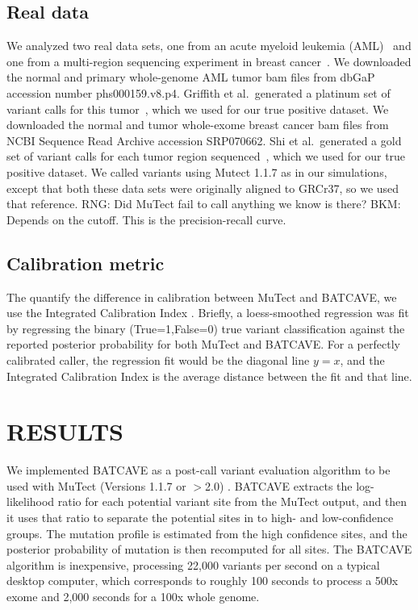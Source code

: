 \documentclass[a4,center,fleqn]{NAR}
\newcommand{\rngcomment}[1]{{\color{red}RNG: #1}}
\newcommand{\bkmcomment}[1]{{\color{blue}BKM: #1}}
\newcommand{\batcave}{BATCAVE\xspace}
\begin{document}
\subsection{Real data}
We analyzed two real data sets, one from an acute myeloid leukemia (AML)~\cite{Griffith2015} and one from a multi-region sequencing experiment in breast cancer~\cite{Shi2018}.
We downloaded the normal and primary whole-genome AML tumor bam files from dbGaP accession number phs000159.v8.p4.
Griffith et al.\ generated a platinum set of variant calls for this tumor~\cite{Griffith2015}, which we used for our true positive dataset.
We downloaded the normal and tumor whole-exome breast cancer bam files from NCBI Sequence Read Archive accession SRP070662.
Shi et al.\ generated a gold set of variant calls for each tumor region sequenced~\cite{Shi2018}, which we used for our true positive dataset.
We called variants using Mutect 1.1.7 as in our simulations, except that both these data sets were originally aligned to GRCr37, so we used that reference.
\rngcomment{Did MuTect fail to call anything we know is there?}
\bkmcomment{Depends on the cutoff. This is the precision-recall curve.}

\subsection{Calibration metric}
The quantify the difference in calibration between MuTect and \batcave, we use the Integrated Calibration Index \cite{Austin2019}.
Briefly, a loess-smoothed regression was fit by regressing the binary (True=1,False=0) true variant classification against the reported posterior probability for both MuTect and \batcave.
For a perfectly calibrated caller, the regression fit would be the diagonal line $y=x$, and the Integrated Calibration Index is the average distance between the fit and that line.


\section{RESULTS}
We implemented \batcave as a post-call variant evaluation algorithm to be used with MuTect (Versions 1.1.7 or $>$2.0) \cite{Cibulskis2013}.
\batcave extracts the log-likelihood ratio for each potential variant site from the MuTect output, and then it uses that ratio to separate the potential sites in to high- and low-confidence groups.
The mutation profile is estimated from the high confidence sites, and the posterior probability of mutation is then recomputed for all sites.
The \batcave algorithm is inexpensive, processing 22,000 variants per second on a typical desktop computer, which corresponds to roughly 100 seconds to process a 500x exome and 2,000 seconds for a 100x whole genome.
\end{document}
